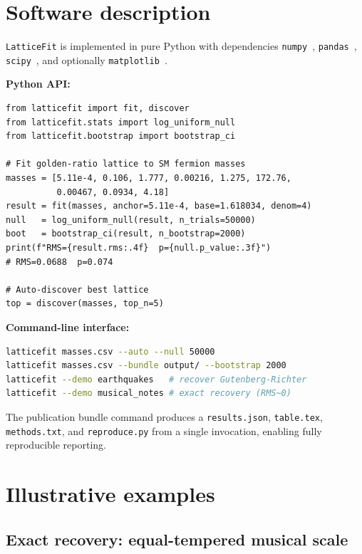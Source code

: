 \documentclass[10pt,a4paper]{article}
\begin{document}
\section{Software description}

\texttt{LatticeFit} is implemented in pure Python with dependencies
\texttt{numpy}~\cite{numpy}, \texttt{pandas}~\cite{pandas},
\texttt{scipy}~\cite{scipy}, and optionally \texttt{matplotlib}~\cite{matplotlib}.

\noindent\textbf{Python API:}
\begin{lstlisting}
from latticefit import fit, discover
from latticefit.stats import log_uniform_null
from latticefit.bootstrap import bootstrap_ci

# Fit golden-ratio lattice to SM fermion masses
masses = [5.11e-4, 0.106, 1.777, 0.00216, 1.275, 172.76,
          0.00467, 0.0934, 4.18]
result = fit(masses, anchor=5.11e-4, base=1.618034, denom=4)
null   = log_uniform_null(result, n_trials=50000)
boot   = bootstrap_ci(result, n_bootstrap=2000)
print(f"RMS={result.rms:.4f}  p={null.p_value:.3f}")
# RMS=0.0688  p=0.074

# Auto-discover best lattice
top = discover(masses, top_n=5)
\end{lstlisting}

\noindent\textbf{Command-line interface:}
\begin{lstlisting}[language=bash]
latticefit masses.csv --auto --null 50000
latticefit masses.csv --bundle output/ --bootstrap 2000
latticefit --demo earthquakes   # recover Gutenberg-Richter
latticefit --demo musical_notes # exact recovery (RMS~0)
\end{lstlisting}

The publication bundle command produces a \texttt{results.json},
\texttt{table.tex}, \texttt{methods.txt}, and \texttt{reproduce.py}
from a single invocation, enabling fully reproducible reporting.

\section{Illustrative examples}

\subsection{Exact recovery: equal-tempered musical scale}
\end{document}
